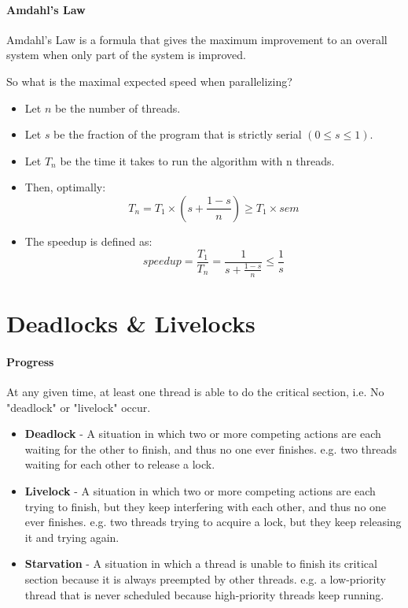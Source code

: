 \documentclass[openany,12pt]{book}
\begin{document}
\paragraph{Amdahl's Law} Amdahl's Law is a formula that gives the maximum improvement to an overall system when only part of the system is improved.\par
So what is the maximal expected speed when parallelizing?
\begin{itemize}
    \item Let \(n\) be the number of threads.
    \item Let \(s\) be the fraction of the program that is strictly serial \((0\leq s \leq 1)\).
    \item Let \(T_n\) be the time it takes to run the algorithm with n threads.
    \item Then, optimally:
          \begin{equation*}
              T_n = T_1 \times \left( s + \frac{1-s}{n} \right) \geq T_1 \times sem
          \end{equation*}
    \item The speedup is defined as:
          \begin{equation*}
              speedup = \frac{T_1}{T_n} = \frac{1}{s + \frac{1-s}{n}} \leq \frac{1}{s}
          \end{equation*}
\end{itemize}


\newpage
\section*{Deadlocks \& Livelocks}

\paragraph{Progress} At any given time, at least one thread is able to do the critical section, i.e. No "deadlock" or "livelock" occur.
\begin{itemize}
    \item \textbf{Deadlock} - A situation in which two or more competing actions are each waiting for the other to finish, and thus no one ever finishes. e.g. two threads waiting for each other to release a lock.

    \item \textbf{Livelock} - A situation in which two or more competing actions are each trying to finish, but they keep interfering with each other, and thus no one ever finishes. e.g. two threads trying to acquire a lock, but they keep releasing it and trying again.

    \item \textbf{Starvation} - A situation in which a thread is unable to finish its critical section because it is always preempted by other threads. e.g. a low-priority thread that is never scheduled because high-priority threads keep running.
\end{itemize}
\end{document}
